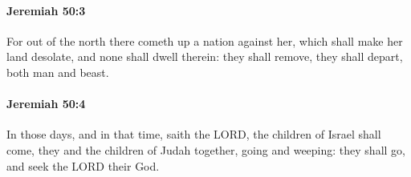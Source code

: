 		\paragraph{Jeremiah 50:3} %
			\label{JEREMIAH-50-3}

			For out of the north there cometh up a nation against her, which shall make her land desolate, and none shall dwell therein: they shall remove, they shall depart, both man and beast.


		\paragraph{Jeremiah 50:4} %
			\label{JEREMIAH-50-4}

			In those days, and in that time, saith the LORD, the children of Israel shall come, they and the children of Judah together, going and weeping: they shall go, and seek the LORD their God.

